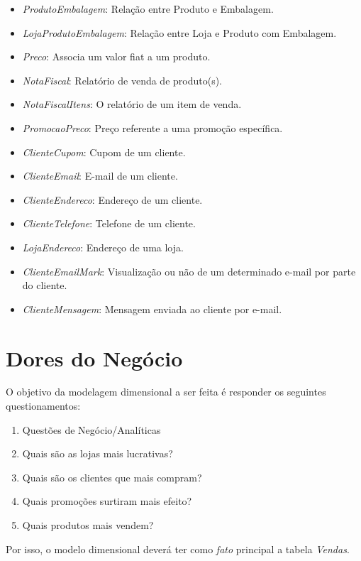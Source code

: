 \begin{itemize}
\item \emph{ProdutoEmbalagem}: Relação entre Produto e Embalagem.
\item \emph{LojaProdutoEmbalagem}: Relação entre Loja e Produto com Embalagem.
\item \emph{Preco}: Associa um valor fiat a um produto.
\item \emph{NotaFiscal}: Relatório de venda de produto(s).
\item \emph{NotaFiscalItens}: O relatório de um item de venda.
\item \emph{PromocaoPreco}: Preço referente a uma promoção específica.
\item \emph{ClienteCupom}: Cupom de um cliente.
\item \emph{ClienteEmail}: E-mail de um cliente.
\item \emph{ClienteEndereco}: Endereço de um  cliente.
\item \emph{ClienteTelefone}: Telefone de um cliente.
\item \emph{LojaEndereco}: Endereço de uma loja.
\item \emph{ClienteEmailMark}: Visualização ou não de um determinado e-mail por parte do cliente.
\item \emph{ClienteMensagem}: Mensagem enviada ao cliente por e-mail.
\end{itemize}

\section{Dores do Negócio}

O objetivo da modelagem dimensional a ser feita é responder os seguintes questionamentos:

\begin{enumerate}
\item Questões de Negócio/Analíticas
\item Quais são as lojas mais lucrativas?
\item Quais são os clientes que mais compram?
\item Quais promoções surtiram mais efeito?
\item Quais produtos mais vendem?
\end{enumerate}

Por isso, o modelo dimensional deverá ter como \emph{fato} principal a tabela \emph{Vendas}.
